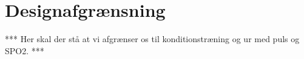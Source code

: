 \section{Designafgrænsning}

*** Her skal der stå at vi afgrænser os til konditionstræning og ur med puls og SPO2. ***